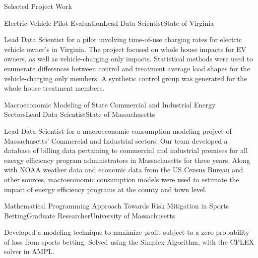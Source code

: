 \documentclass{resume} %
\begin{document}
\begin{rSection}{Selected Project Work}
\begin{rSubsection}{Electric Vehicle Pilot Evaluation}{}{Lead Data Scientist}{State of Virginia}
\item[] Lead Data Scientist for a pilot involving time-of-use charging rates for electric vehicle owner's in Virginia. The project focused on whole house impacts for EV owners, as well as vehicle-charging only impacts. Statistical methods were used to enumerate differences between control and treatment average load shapes for the vehicle-charging only members. A synthetic control group was generated for the whole house treatment members.
\end{rSubsection}

\begin{rSubsection}{Macroeconomic Modeling of State Commercial and Industrial Energy Sectors}{}{Lead Data Scientist}{State of Massachusetts}
\item[] Lead Data Scientist for a macroeconomic consumption modeling project of Massachusetts' Commercial and Industrial sectors. Our team developed a database of billing data pertaining to commercial and industrial premises for all energy efficiency program administrators in Massachusetts for three years. Along with NOAA weather data and economic data from the US Census Bureau and other sources, macroeconomic consumption models were used to estimate the impact of energy efficiency programs at the county and town level.
\end{rSubsection}

\begin{rSubsection}{Mathematical Programming Approach Towards Risk Mitigation in Sports Betting}{}{Graduate Researcher}{University of Massachusetts}
\item[] Developed a modeling technique to maximize profit subject to a zero probability of loss from sports betting. Solved using the Simplex Algorithm, with the CPLEX solver in AMPL.
\end{rSubsection}

\end{rSection}

\pagebreak

\end{document}
